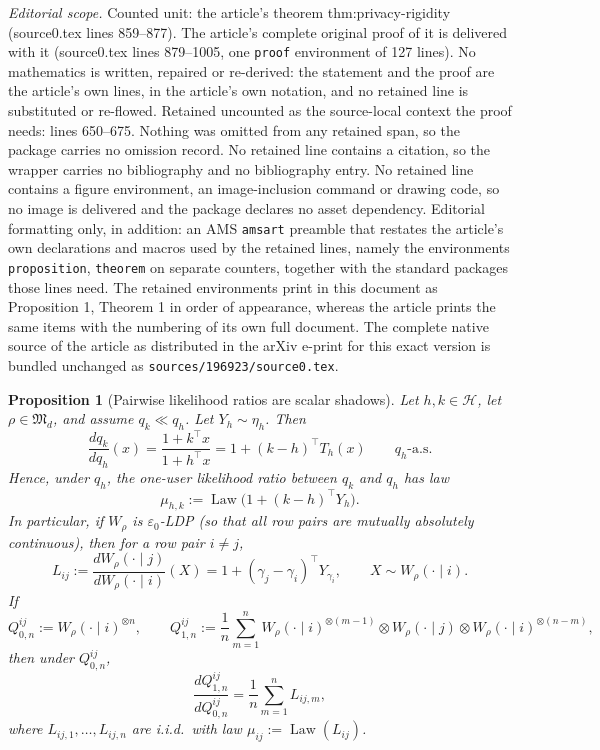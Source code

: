 \documentclass[10pt,a4paper]{amsart}
\newtheorem{proposition}{Proposition}
\DeclareMathOperator{\Law}{Law}
\newcommand{\cH}{\mathcal H}
\newcommand{\fM}{\mathfrak M}
\begin{document}
\noindent\textit{Editorial scope.} Counted unit: the article's theorem thm:privacy-rigidity (source0.tex lines 859--877). The article's complete original proof of it is delivered with it (source0.tex lines 879--1005, one \texttt{proof} environment of 127 lines). No mathematics is written, repaired or re-derived: the statement and the proof are the article's own lines, in the article's own notation, and no retained line is substituted or re-flowed.  Retained uncounted as the source-local context the proof needs: lines 650--675.  Nothing was omitted from any retained span, so the package carries no omission record.  No retained line contains a citation, so the wrapper carries no bibliography and no bibliography entry.  No retained line contains a figure environment, an image-inclusion command or drawing code, so no image is delivered and the package declares no asset dependency.  Editorial formatting only, in addition: an AMS \texttt{amsart} preamble that restates the article's own declarations and macros used by the retained lines, namely the environments \texttt{proposition}, \texttt{theorem} on separate counters, together with the standard packages those lines need.  The retained environments print in this document as Proposition 1, Theorem 1 in order of appearance, whereas the article prints the same items with the numbering of its own full document.  The complete native source of the article as distributed in the arXiv e-print for this exact version is bundled unchanged as \texttt{sources/196923/source0.tex}.
\begin{proposition}[Pairwise likelihood ratios are scalar shadows]\label{prop:pairwise-lr}
Let $h,k\in\cH$, let $\rho\in\fM_d$, and assume $q_k\ll q_h$. Let $Y_h\sim\eta_h$. Then
\[
\frac{dq_k}{dq_h}(x)=\frac{1+k^\top x}{1+h^\top x}=1+(k-h)^\top T_h(x)
\qquad q_h\text{-a.s.}
\]
Hence, under $q_h$, the one-user likelihood ratio between $q_k$ and $q_h$ has law
\[
\mu_{h,k}:=\Law\bigl(1+(k-h)^\top Y_h\bigr).
\]
In particular, if $W_\rho$ is $\varepsilon_0$-LDP (so that all row pairs are mutually absolutely continuous), then for a row pair $i\neq j$,
\[
L_{ij}:=\frac{dW_\rho(\cdot\mid j)}{dW_\rho(\cdot\mid i)}(X)=1+(\gamma_j-\gamma_i)^\top Y_{\gamma_i},\qquad X\sim W_\rho(\cdot\mid i).
\]
If
\[
Q_{0,n}^{ij}:=W_\rho(\cdot\mid i)^{\otimes n},
\qquad
Q_{1,n}^{ij}:=\frac1n\sum_{m=1}^n W_\rho(\cdot\mid i)^{\otimes(m-1)}\otimes W_\rho(\cdot\mid j)\otimes W_\rho(\cdot\mid i)^{\otimes(n-m)},
\]
then under $Q_{0,n}^{ij}$,
\[
\frac{dQ_{1,n}^{ij}}{dQ_{0,n}^{ij}}=\frac1n\sum_{m=1}^n L_{ij,m},
\]
where $L_{ij,1},\dots,L_{ij,n}$ are i.i.d.\ with law $\mu_{ij}:=\Law(L_{ij})$.
\end{proposition}
\end{document}
